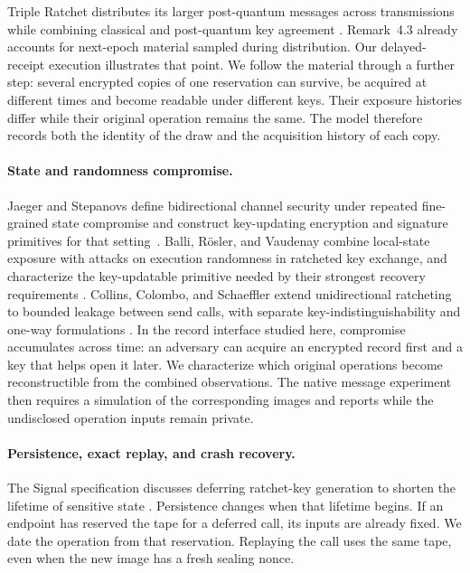 \documentclass[pdflatex]{sn-jnl}
\theoremstyle{thmstyleone}
\theoremstyle{thmstylethree}
\theoremstyle{thmstyletwo}
\begin{document}
Triple Ratchet distributes its larger post-quantum messages across
transmissions while combining classical and post-quantum key agreement
\cite{tripleratchet2025}. Remark~4.3 already accounts for next-epoch
material sampled during distribution. Our delayed-receipt execution
illustrates that point. We follow the material through a further
step: several encrypted copies of one reservation can survive, be
acquired at different times and become readable under different keys.
Their exposure histories differ while their original operation remains
the same. The model therefore records both the identity of the draw and
the acquisition history of each copy.

\paragraph{State and randomness compromise.}
Jaeger and Stepanovs define bidirectional channel security under repeated
fine-grained state compromise and construct key-updating encryption and
signature primitives for that setting~\cite{jaeger2018channel}.
Balli, R\"osler, and Vaudenay combine local-state exposure with attacks on
execution randomness in ratcheted key exchange, and characterize the
key-updatable primitive needed by their strongest recovery requirements
\cite{balli2020ratcheting}. Collins, Colombo, and Schaeffler extend
unidirectional ratcheting to bounded leakage between send calls, with
separate key-indistinguishability and one-way formulations
\cite{collins2025leakage}.
In the record interface studied here, compromise accumulates across
time: an adversary can acquire an encrypted record first and a key
that helps open it later. We characterize which original operations
become reconstructible from the combined observations. The native
message experiment then requires a simulation of the corresponding
images and reports while the undisclosed operation inputs remain private.

\paragraph{Persistence, exact replay, and crash recovery.}
The Signal specification discusses deferring ratchet-key generation to shorten
the lifetime of sensitive state \cite[Section~8.5]{doubleratchet2025}.
Persistence changes when that lifetime begins. If an endpoint has
reserved the tape for a deferred call, its inputs are already fixed.
We date the operation from that reservation. Replaying the call uses
the same tape, even when the new image has a fresh sealing nonce.
\end{document}
